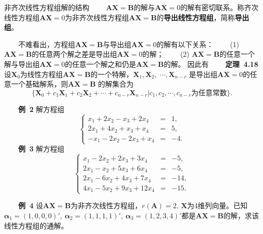 \documentclass[compress,mathserif,cjk]{beamer}
\theoremstyle{remark}
\numberwithin{equation}{section}
\newcommand{\hei}{\bf}      %
\newcommand{\xiaoerhao}{\fontsize{18pt}{\baselineskip}\selectfont}  %
\begin{document}
\begin{CJK}{UTF8}{gbsn}
\begin{frame}{非齐次线性方程组解的结构}
\ \ \ \ $\bm{AX}=\bm B$的解与$\bm{AX}=0$的解有密切联系。称齐次线性方程组$\bm{AX}=0$为非齐次线性方程组$\bm{AX}=\bm B$的{\hei 导出线性方程组}，简称{\hei 导出组}。

\pause\vskip 5pt
\ \ \ \ 不难看出，方程组$\bm{AX}=\bm B$与导出组$\bm{AX}=0$的解有以下关系：
\vskip 5pt
\ \ \ \ (1) $\bm{AX}=\bm B$的任意两个解之差是导出组$\bm{AX}=0$的解；
\vskip 5pt
\ \ \ \ (2) $\bm{AX}=\bm B$的任意一个解与导出组$\bm{AX}=0$的任意一个解之和仍是$\bm{AX}=\bm B$的解。
\pause\vskip 5pt
因此有
\vskip 1pt
\ \ \ \ {\hei 定理~4.18} 设$\bm X_0$为线性方程组$\bm{AX}=\bm B$的一个特解，$\bm X_1,\bm X_2,$ $\cdots,\bm X_{n-r}$ 是导出组$\bm{AX}=0$的任意一个基础解系，则$\bm{AX}=\bm B$ 的解集合为
$$\big\{\bm X_0+c_1\bm X_1+c_2\bm X_2+\cdots+c_{n-r}\bm X_{n-r}|c_1,c_2,\cdots,c_{n-r}\mbox{为任意常数}\big\}.$$

\end{frame}
\begin{frame}
\ \ \ \ {\hei 例~2} 解方程组
$$\left\{\begin{array}{rcl}
x_1+2x_2-x_3+2x_4&=&1,\\2x_1+4x_2+x_3+x_4&=&5,\\-x_1-2x_2-2x_3+x_4&=&-4.
\end{array}\right.$$
\pause\vskip 10pt
\ \ \ \ {\hei 例~3} 解方程组
$$\left\{\begin{array}{rcl}
x_1-2x_2+2x_3+3x_4&=&-5,\\2x_1-x_2+5x_3+6x_4&=&-5,\\2x_1-6x_2+4x_3+7x_4&=&-14,\\4x_1-5x_2+9x_3+12x_4&=&-15.
\end{array}\right.$$
\end{frame}
\begin{frame}
\ \ \ \ {\hei 例~4} 设$\bm{AX}=\bm B$为非齐次线性方程组，$r(\bm A)=2$, $\bm X$为4维列向量。已知$\bm\alpha_1=(1,0,0,0)',~\bm\alpha_2=(1,1,1,1)',~\bm\alpha_3=(1,2,3,4)'$都是$\bm{AX}=\bm B$的解，求该线性方程组的通解。
\end{frame}




\begin{frame}
\begin{center}
{\textcolor[rgb]{0.50,0.00,1.00}{\textbf{\xiaoerhao{Thanks for your attention!}}}}\bigskip
\end{center}
\end{frame}
\end{CJK}
\end{document}
